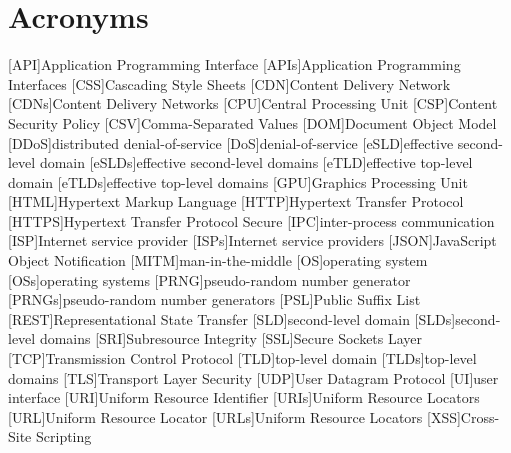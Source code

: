 \chapter*{Acronyms}

\begin{acronym}[HTTPS ]\itemsep4pt
    [API]{Application Programming Interface}
    [APIs]{Application Programming Interfaces}
    [CSS]{Cascading Style Sheets}
    [CDN]{Content Delivery Network}
    [CDNs]{Content Delivery Networks}
    [CPU]{Central Processing Unit}
    [CSP]{Content Security Policy}
    [CSV]{Comma-Separated Values}
    [DOM]{Document Object Model}
    [DDoS]{distributed denial-of-service}
    [DoS]{denial-of-service}
    [eSLD]{effective second-level domain}
    [eSLDs]{effective second-level domains}
    [eTLD]{effective top-level domain}
    [eTLDs]{effective top-level domains}
    [GPU]{Graphics Processing Unit}
    [HTML]{Hypertext Markup Language}
    [HTTP]{Hypertext Transfer Protocol}
    [HTTPS]{Hypertext Transfer Protocol Secure}
    [IPC]{inter-process communication}
    [ISP]{Internet service provider}
    [ISPs]{Internet service providers}
    [JSON]{JavaScript Object Notification}
    [MITM]{man-in-the-middle}
    [OS]{operating system}
    [OSs]{operating systems}
    [PRNG]{pseudo-random number generator}
    [PRNGs]{pseudo-random number generators}
    [PSL]{Public Suffix List}
    [REST]{Representational State Transfer}
    [SLD]{second-level domain}
    [SLDs]{second-level domains}
    [SRI]{Subresource Integrity}
    [SSL]{Secure Sockets Layer}
    [TCP]{Transmission Control Protocol}
    [TLD]{top-level domain}
    [TLDs]{top-level domains}
    [TLS]{Transport Layer Security}
    [UDP]{User Datagram Protocol}
    [UI]{user interface}
    [URI]{Uniform Resource Identifier}
    [URIs]{Uniform Resource Locators}
    [URL]{Uniform Resource Locator}
    [URLs]{Uniform Resource Locators}
    [XSS]{Cross-Site Scripting}
\end{acronym}
